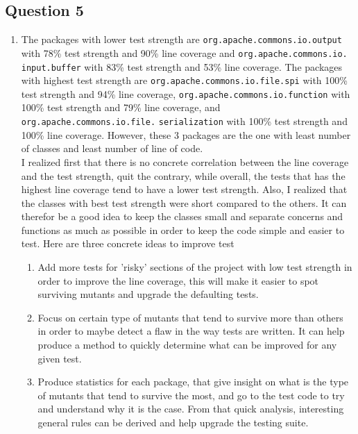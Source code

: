 \newpage

\subsection*{Question 5}

\begin{enumerate}
    \item 
    \noindent The packages with lower test strength are \verb|org.apache.commons.io.output| with 78\% test strength and 90\% line coverage and \verb|org.apache.commons.io.| \verb|input.buffer| with 83\% test strength and 53\% line coverage. The packages with highest test strength are \verb|org.apache.commons.io.file.spi| with 100\% test strength and 94\% line coverage, \verb|org.apache.commons.io.function| with 100\% test strength and 79\% line coverage, and \verb|org.apache.commons.io.file.| \verb|serialization| with 100\% test strength and 100\% line coverage. However, these 3 packages are the one with least number of classes and least number of line of code.\\ I realized first that there is no concrete correlation between the line coverage and the test strength, quit the contrary, while overall, the tests that has the highest line coverage tend to have a lower test strength. Also, I realized that the classes with best test strength were short compared to the others. It can therefor be a good idea to keep the classes small and separate concerns and functions as much as possible in order to keep the code simple and easier to test.
    Here are three concrete ideas to improve test 
    \begin{enumerate}[label={\arabic* -}]
        \item Add more tests for 'risky' sections of the project with low test strength in order to improve the line coverage, this will make it easier to spot surviving mutants and upgrade the defaulting tests.
        \item Focus on certain type of mutants that tend to survive more than others in order to maybe detect a flaw in the way tests are written. It can help produce a method to quickly determine what can be improved for any given test. 
        \item Produce statistics for each package, that give insight on what is the type of mutants that tend to survive the most, and go to the test code to try and understand why it is the case. From that quick analysis, interesting general rules can be derived and help upgrade the testing suite.
    \end{enumerate}

\end{enumerate}
